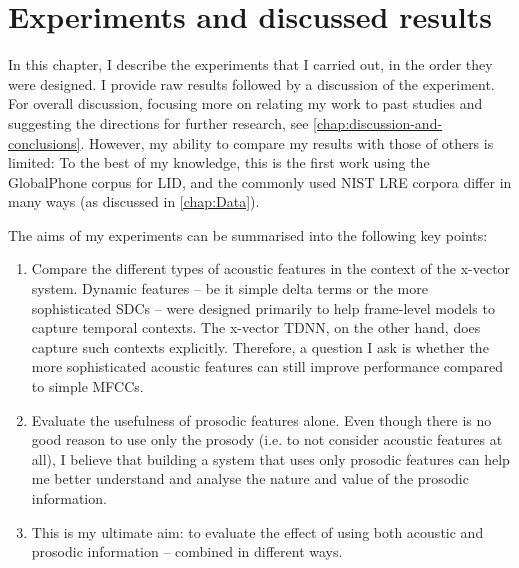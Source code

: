 \documentclass[bsc,frontabs,twoside,singlespacing,parskip,deptreport]{infthesis}
\begin{document}
\chapter{Experiments and discussed results}{
  \label{chap:Experiments}

  In this chapter, I describe the experiments that I carried out, in the order they were designed. I provide raw results followed by a discussion of the experiment. For overall discussion, focusing more on relating my work to past studies and suggesting the directions for further research, see \autoref{chap:discussion-and-conclusions}. However, my ability to compare my results with those of others is limited: To the best of my knowledge, this is the first work using the GlobalPhone corpus for LID, and the commonly used NIST LRE corpora differ in many ways (as discussed in \autoref{chap:Data}).

  The aims of my experiments can be summarised into the following key points:
  \begin{enumerate}
    \item {Compare the different types of acoustic features in the context of the x-vector system. Dynamic features -- be it simple delta terms or the more sophisticated SDCs -- were designed primarily to help frame-level models to capture temporal contexts. The x-vector TDNN, on the other hand, does capture such contexts explicitly. Therefore, a question I ask is whether the more sophisticated acoustic features can still improve performance compared to simple MFCCs.}
    
    \item {Evaluate the usefulness of prosodic features alone. Even though there is no good reason to use only the prosody (i.e. to not consider acoustic features at all), I believe that building a system that uses only prosodic features can help me better understand and analyse the nature and value of the prosodic information.}
    
    \item {This is my ultimate aim: to evaluate the effect of using both acoustic and prosodic information -- combined in different ways.}
  \end{enumerate}

}
\end{document}
